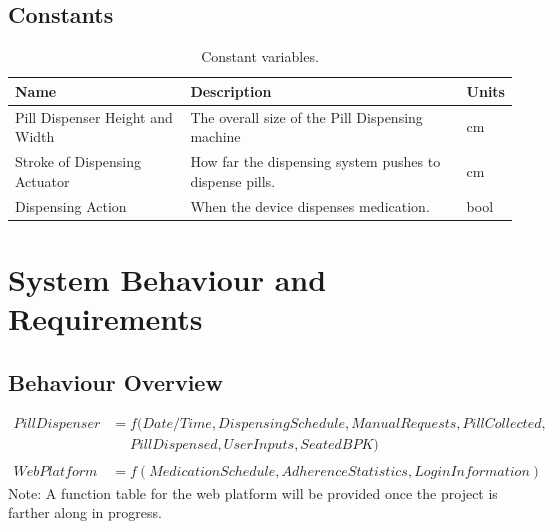 \documentclass[12pt,titlepage]{article}
\begin{document}
\subsection{Constants}
\begin{table}[ht!]
\begin{center}
\begin{adjustbox}{max width=\textwidth}
\small
\begin{tabular}{|p{}|p{}|p{}|}
 \hline
 \textbf{Name} & \textbf{Description} & \textbf{Units}\\
 \hline 
 Pill Dispenser Height and Width & The overall size of the Pill Dispensing machine & cm\\
 \hline
  Stroke of Dispensing Actuator & How far the dispensing system pushes to dispense pills. & cm\\
 \hline
   Dispensing Action & When the device dispenses medication. & bool\\
 \hline
\end{tabular}
\end{adjustbox}
\end{center}
\caption{Constant variables.}
\end{table}


\section{System Behaviour and Requirements}
\subsection{Behaviour Overview}
\vspace{-.5cm}
\begin{align*}
    PillDispenser &= f(Date/Time, DispensingSchedule, ManualRequests, Pill Collected, \\ & \ \ \ \ \ \ Pill Dispensed, UserInputs, SeatedBPK) \\ \\
    WebPlatform &= f(MedicationSchedule, AdherenceStatistics, LoginInformation) %
\end{align*}
Note: A function table for the web platform will be provided once the project is farther along in progress. 
\end{document}
